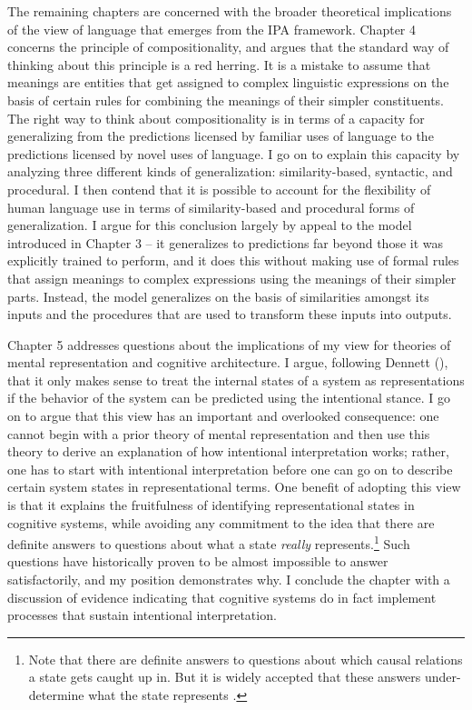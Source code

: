 The remaining chapters are concerned with the broader theoretical implications of the view of language that emerges from the IPA framework. Chapter 4 concerns the principle of compositionality, and argues that the standard way of thinking about this principle is a red herring. It is a mistake to assume that meanings are entities that get assigned to complex linguistic expressions on the basis of certain rules for combining the meanings of their simpler constituents. The right way to think about compositionality is in terms of a capacity for generalizing from the predictions licensed by familiar uses of language to the predictions licensed by novel uses of language. I go on to explain this capacity by analyzing three different kinds of generalization: similarity-based, syntactic, and procedural. I then contend that it is possible to account for the flexibility of human language use in terms of similarity-based and procedural forms of generalization. I argue for this conclusion largely by appeal to the model introduced in Chapter 3 -- it generalizes to predictions far beyond those it was explicitly trained to perform, and it does this without making use of formal rules that assign meanings to complex expressions using the meanings of their simpler parts. Instead, the model generalizes on the basis of similarities amongst its inputs and the procedures that are used to transform these inputs into outputs. 

Chapter 5 addresses questions about the implications of my view for theories of mental representation and cognitive architecture. I argue, following Dennett (\citeyear{Dennett:1987}), that it only makes sense to treat the internal states of a system as representations if the behavior of the system can be predicted using the intentional stance. I go on to argue that this view has an important and overlooked consequence: one cannot begin with a prior theory of mental representation and then use this theory to derive an explanation of how intentional interpretation works; rather, one has to start with intentional interpretation before one can go on to describe certain system states in representational terms. One benefit of adopting this view is that it explains the fruitfulness of identifying representational states in cognitive systems, while avoiding any commitment to the idea that there are definite answers to questions about what a state \textit{really} represents.\footnote{Note that there are definite answers to questions about which causal relations a state gets caught up in. But it is widely accepted that these answers under-determine what the state represents \citep{Dennett:1987}.} Such questions have historically proven to be almost impossible to answer satisfactorily, and my position demonstrates why. I conclude the chapter with a discussion of evidence indicating that cognitive systems do in fact implement processes that sustain intentional interpretation. 

